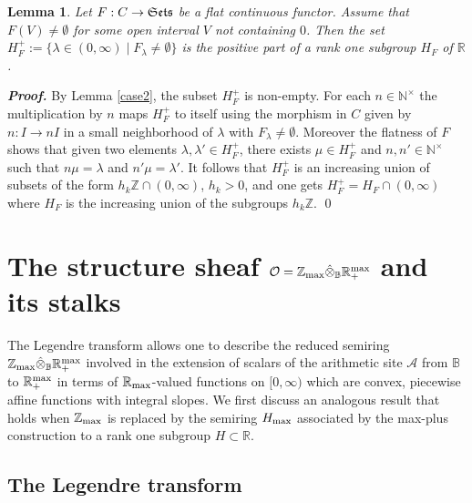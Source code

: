 \documentclass{elsart3-1}
\newtheorem{lemma}[theorem]{Lemma}
\def\B{{\mathbb B}}
\def\N{{\mathbb N}}
\def\R{{\mathbb R}}
\def\Z{{\mathbb Z}}
\def\aarith{{\mathscr A}}
\def\cO{{\mathcal O}}
\def\zmax{{\Z_{\rm max}}}
\def\rmax{\R_+^{\rm max}}
\def\rma{\R_{\rm max}}
\def\Se{\frak{ Sets}}
\def\nt{\N^{\times}}
\begin{document}
\begin{lemma}\label{case2bis} Let $F:C\to \Se$ be a flat continuous functor.
Assume that $F(V)\neq \emptyset$ for some open interval $V$ not containing $0$. Then the set $H^+_F:=\{\lambda\in(0,\infty)\mid F_\lambda\neq \emptyset\}$ is the positive part of a rank one subgroup $H_F$ of $\R$.
\end{lemma}
{\it\bf Proof.} By Lemma \ref{case2}, the subset $H^+_F$ is non-empty. For each $n\in\nt$ the multiplication by $n$ maps $H^+_F$ to itself using the morphism in $C$ given by $n:I\to nI$ in a small neighborhood of $\lambda$ with $F_\lambda\neq \emptyset$. Moreover the flatness of $F$ shows that given two elements $\lambda,\lambda'\in H^+_F$, there exists $\mu\in H^+_F$ and $n,n'\in\nt$ such that $n\mu=\lambda$ and $n'\mu=\lambda'$. It follows that $H^+_F$ is an increasing union of subsets of the form $h_k\Z\cap (0,\infty)$, $h_k>0$, and one gets $H^+_F=H_F\cap (0,\infty)$ where $H_F$ is the increasing union of the subgroups $h_k\Z$. \qed
\vspace*{-.5cm}
 
\section{The structure sheaf $\cO=\zmax\hat\otimes_\B\rmax$ and its stalks} 

\vspace*{-.3cm}

The Legendre transform allows one to describe the reduced semiring $\zmax\hat\otimes_\B\rmax$  involved in the extension of scalars of the arithmetic site $\aarith$ from $\B$ to $\rmax$ in terms of 
$\rma$-valued functions on $[0,\infty)$ which are convex, piecewise affine functions with integral slopes.
We first discuss an analogous result that holds when $\zmax$ is replaced by  the semiring $H_{\rm max}$ associated by the max-plus construction to a rank one subgroup $H\subset \R$.

\vspace*{-.3cm}
\subsection{The Legendre transform}
\vspace*{-.3cm}
\end{document}
